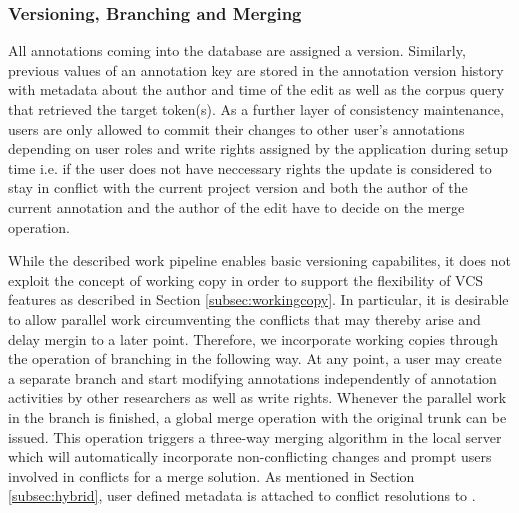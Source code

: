 \documentclass{sig-alternate}
\begin{document}

\subsubsection{Versioning, Branching and Merging}\label{subsec:dbversion}

All annotations coming into the database are assigned a version. Similarly, previous values
of an annotation key are stored in the annotation version history with metadata about the author
and time of the edit as well as the corpus query that retrieved the target token(s).
As a further layer of consistency maintenance, users are only allowed to commit their changes
to other user's annotations depending on user roles and write rights assigned by the application
during setup time \textemdash i.e. if the user does not have neccessary rights the update is
considered to stay in conflict with the current project version and both the author of the
current annotation and the author of the edit have to decide on the merge operation.

While the described work pipeline enables basic versioning capabilites, it does not exploit
the concept of working copy in order to support the flexibility of VCS features as described in
Section \ref{subsec:workingcopy}. In particular, it is desirable to allow parallel work \textemdash
circumventing the conflicts that may thereby arise \textemdash and delay mergin to a later point. 
Therefore, we incorporate working copies through the operation of branching in the following way.
At any point, a user may create a separate branch and start modifying annotations independently of
annotation activities by other researchers as well as write rights. Whenever the parallel work in
the branch is finished, a global merge operation with the original trunk can be issued.
This operation triggers a three-way merging algorithm in the local server which will
automatically incorporate non-conflicting changes and prompt users involved in conflicts for
a merge solution. As mentioned in Section \ref{subsec:hybrid}, user defined metadata is attached
to conflict resolutions to .
\end{document}
